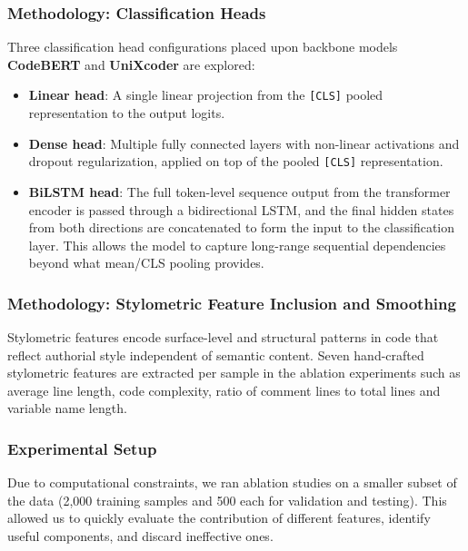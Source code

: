 \documentclass[11pt]{article}
\begin{document}
\subsubsection{Methodology: Classification Heads}
Three classification head configurations placed upon backbone models \textbf{CodeBERT} and \textbf{UniXcoder} are explored:

\begin{itemize}
    \item \textbf{Linear head}: A single linear projection from the \texttt{[CLS]}
    pooled representation to the output logits.
    \item \textbf{Dense head}: Multiple fully connected layers with non-linear
    activations and dropout regularization, applied on top of the pooled
    \texttt{[CLS]} representation.
    \item \textbf{BiLSTM head}: The full token-level sequence output from the
    transformer encoder is passed through a bidirectional LSTM, and the final
    hidden states from both directions are concatenated to form the input to
    the classification layer. This allows the model to capture long-range
    sequential dependencies beyond what mean/CLS pooling provides.
\end{itemize}
\subsubsection{Methodology: Stylometric Feature Inclusion and Smoothing}
Stylometric features encode surface-level and structural patterns in code that
reflect authorial style independent of semantic content. Seven hand-crafted
stylometric features are extracted per sample in the ablation experiments such as average line length, code complexity, ratio of comment lines to total lines and variable name length.
\subsubsection{Experimental Setup}
Due to computational constraints, we ran ablation studies on a smaller subset of the data (2,000 training samples and 500 each for validation and testing). This allowed us to quickly evaluate the contribution of different features, identify useful components, and discard ineffective ones.
\end{document}
